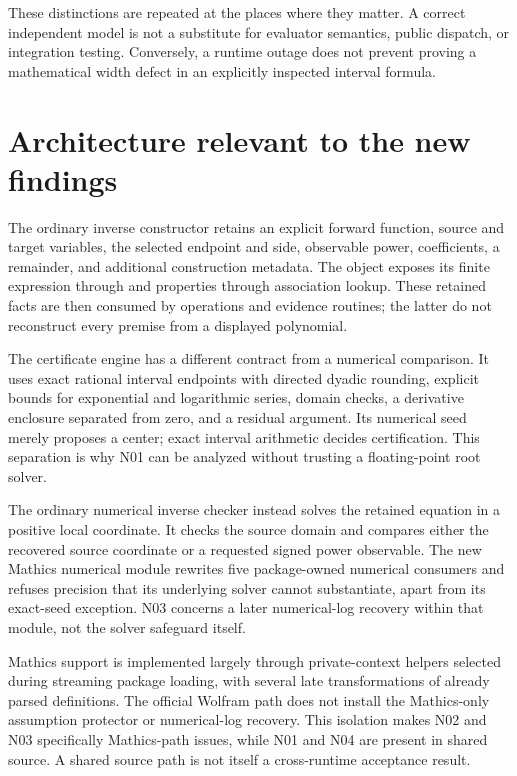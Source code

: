 \documentclass[11pt,letterpaper]{article}
\newcommand{\code}[1]{\texttt{\detokenize{#1}}}
\begin{document}
These distinctions are repeated at the places where they matter. A correct independent model is not a substitute for evaluator semantics, public dispatch, or integration testing. Conversely, a runtime outage does not prevent proving a mathematical width defect in an explicitly inspected interval formula.

\section{Architecture relevant to the new findings}

The ordinary inverse constructor retains an explicit forward function, source and target variables, the selected endpoint and side, observable power, coefficients, a remainder, and additional construction metadata. The \code{GeneralizedSeries} object exposes its finite expression through \code{Normal} and properties through association lookup. These retained facts are then consumed by operations and evidence routines; the latter do not reconstruct every premise from a displayed polynomial.\cite{core,series}

The certificate engine has a different contract from a numerical comparison. It uses exact rational interval endpoints with directed dyadic rounding, explicit bounds for exponential and logarithmic series, domain checks, a derivative enclosure separated from zero, and a residual argument. Its numerical seed merely proposes a center; exact interval arithmetic decides certification. This separation is why N01 can be analyzed without trusting a floating-point root solver.\cite{cert}

The ordinary numerical inverse checker instead solves the retained equation in a positive local coordinate. It checks the source domain and compares either the recovered source coordinate or a requested signed power observable. The new Mathics numerical module rewrites five package-owned numerical consumers and refuses precision that its underlying solver cannot substantiate, apart from its exact-seed exception. N03 concerns a later numerical-log recovery within that module, not the solver safeguard itself.\cite{numerical,mathics-numerical,r45}

Mathics support is implemented largely through private-context helpers selected during streaming package loading, with several late transformations of already parsed definitions. The official Wolfram path does not install the Mathics-only assumption protector or numerical-log recovery. This isolation makes N02 and N03 specifically Mathics-path issues, while N01 and N04 are present in shared source. A shared source path is not itself a cross-runtime acceptance result.\cite{mathics-compat,core,mathics-input,mathics-numerical}
\end{document}
